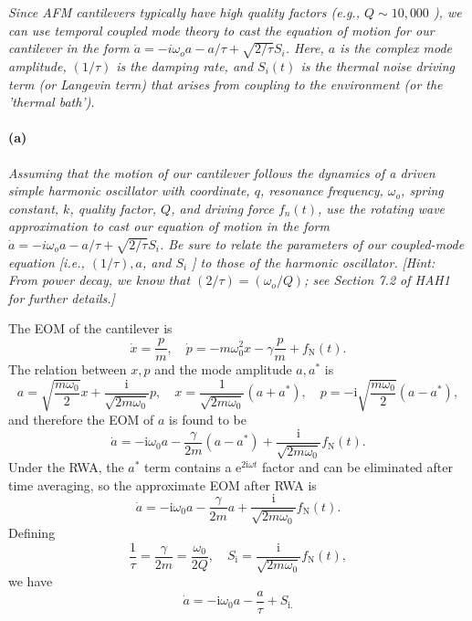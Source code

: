\documentclass[hyperref, a4paper]{article}
\newcommand*{\ii}{\mathrm{i}}
\newcommand*{\ee}{\mathrm{e}}
\newcommand*{\Si}[1]{{S_{\text{i#1}}}}
\newcommand*{\fn}{f_{\text{N}}}
\begin{document}
\textit{Since AFM cantilevers typically have high quality factors (e.g., $Q \sim 10,000$ ), we can use temporal coupled mode theory to cast the equation of motion for our cantilever in the form $\dot{a}=-i \omega_o a-a / \tau+\sqrt{2 / \tau} S_i$. Here, $a$ is the complex mode amplitude, $(1 / \tau)$ is the damping rate, and $S_i(t)$ is the thermal noise driving term (or Langevin term) that arises from coupling to the environment (or the 'thermal bath').}

\paragraph*{(a)} \textit{Assuming that the motion of our cantilever follows the dynamics of a driven simple harmonic oscillator with coordinate, $q$, resonance frequency, $\omega_o$, spring constant, $k$, quality factor, $Q$, and driving force $f_n(t)$, use the rotating wave approximation to cast our equation of motion in the form $\dot{a}=-i \omega_o a-a / \tau+\sqrt{2 / \tau} S_i$. Be sure to relate the parameters of our coupled-mode equation [i.e., $(1 / \tau), a$, and $S_i$ ] to those of the harmonic oscillator.} 
\textit{[Hint: From power decay, we know that $(2 / \tau)=\left(\omega_o / Q\right)$; see Section 7.2 of HAH1 for further details.]}

The EOM of the cantilever is 
\begin{equation}
    \dot{x} = \frac{p}{m}, \quad \dot{p} = - m \omega_0^2 x - \gamma \frac{p}{m} + \fn(t).
\end{equation}
The relation between $x, p$ and the mode amplitude $a, a^*$ is 
\begin{equation}
    a = \sqrt{\frac{m \omega_0}{2}} x + \frac{\ii}{\sqrt{2 m \omega_0}} p, \quad 
    x = \frac{1}{\sqrt{2 m \omega_0}} (a + a^*), \quad 
    p = - \ii \sqrt{\frac{m \omega_0}{2}} (a - a^*),
\end{equation}
and therefore the EOM of $a$ is found to be 
\begin{equation}
    \dot{a} = - \ii \omega_0 a - \frac{\gamma}{2 m} (a - a^*) + \frac{\ii}{\sqrt{2 m \omega_0}} \fn(t).
\end{equation}
Under the RWA, the $a^*$ term contains a $\ee^{2 \ii \omega t}$ factor and can be eliminated after time averaging,
so the approximate EOM after RWA is 
\begin{equation}
    \dot{a} = - \ii \omega_0 a - \frac{\gamma}{2m} a + \frac{\ii}{\sqrt{2 m \omega_0}} \fn(t).
\end{equation}
Defining 
\begin{equation}
    \frac{1}{\tau} = \frac{\gamma}{2m} = \frac{\omega_0}{2Q}, \quad \Si{} = \frac{\ii}{\sqrt{2 m \omega_0}} \fn(t),
\end{equation}
we have 
\begin{equation}
    \dot{a} = - \ii \omega_0 a - \frac{a}{\tau} + \Si.
\end{equation}
\end{document}
